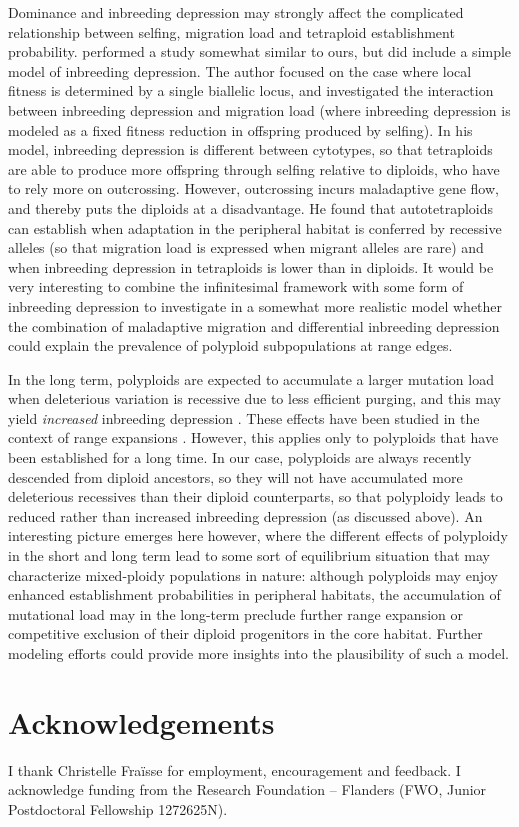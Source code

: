 \documentclass[12pt,a4paper]{article}
\begin{document}
Dominance and inbreeding depression may strongly affect the complicated
relationship between selfing, migration load and tetraploid establishment
probability.
\cite{griswold2021} performed a study somewhat similar to ours, but did include
a simple model of inbreeding depression.
The author focused on the case where local fitness is determined by a single
biallelic locus, and investigated the interaction between inbreeding depression
and migration load (where inbreeding depression is modeled as a fixed fitness
reduction in offspring produced by selfing).
In his model, inbreeding depression is different between cytotypes, so that
tetraploids are able to produce more offspring through selfing relative to
diploids, who have to rely more on outcrossing.
However, outcrossing incurs maladaptive gene flow, and thereby puts the
diploids at a disadvantage. 
He found that autotetraploids can establish when adaptation in the
peripheral habitat is conferred by recessive alleles (so that migration load is
expressed when migrant alleles are rare) and when inbreeding depression in
tetraploids is lower than in diploids.
It would be very interesting to combine the infinitesimal framework with some
form of inbreeding depression to investigate in a somewhat more realistic model
whether the combination of maladaptive migration and differential inbreeding
depression could explain the prevalence of polyploid subpopulations at range
edges.

In the long term, polyploids are expected to accumulate a larger
mutation load when deleterious variation is recessive due to less efficient
purging, and this may yield \textit{increased} inbreeding depression
\citep{vlcek2025biorxiv}.
These effects have been studied in the context of range expansions
\citep{booker2024}.
However, this applies only to polyploids that have been established for a long
time.
In our case, polyploids are always recently descended from diploid ancestors,
so they will not have accumulated more deleterious recessives than their
diploid counterparts, so that polyploidy leads to reduced rather than increased
inbreeding depression (as discussed above).
An interesting picture emerges here however, where the different effects of
polyploidy in the short and long term lead to some sort of equilibrium
situation that may characterize mixed-ploidy populations in nature: although
polyploids may enjoy enhanced establishment probabilities in peripheral
habitats, the accumulation of mutational load may in the long-term preclude
further range expansion or competitive exclusion of their diploid progenitors
in the core habitat.
Further modeling efforts could provide more insights into the plausibility of
such a model.



\section*{Acknowledgements}

I thank Christelle Fraïsse for employment, encouragement and feedback. I
acknowledge funding from the Research Foundation -- Flanders (FWO, Junior
Postdoctoral Fellowship 1272625N).



\end{document}

